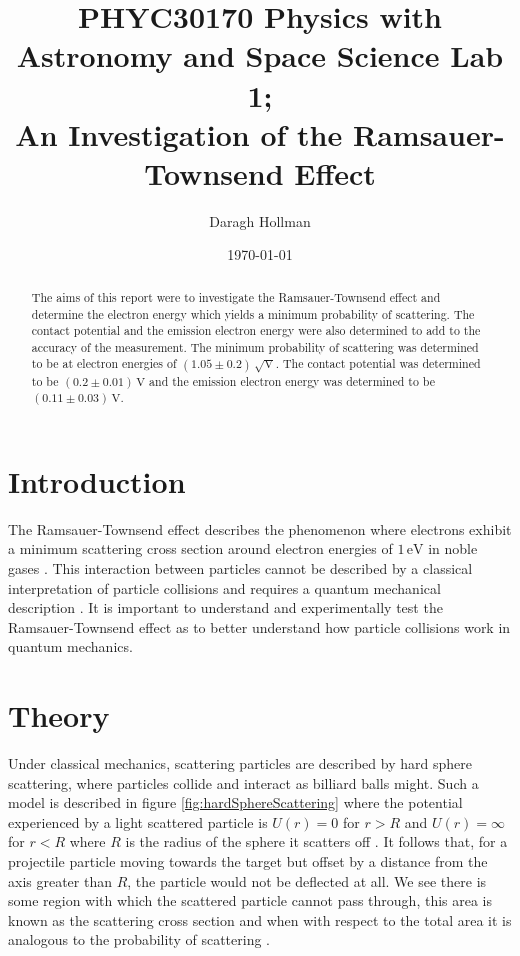 \documentclass[%
reprint,
amsmath,amssymb,
aps,
floatfix
]{revtex4-2}
\begin{document}
	
	
	\title{PHYC30170 Physics with Astronomy and Space Science Lab 1;\\An Investigation of the Ramsauer-Townsend Effect}
	
	\author{Daragh Hollman}
	
	\date{\today}
	
	\begin{abstract}
	The aims of this report were to investigate the Ramsauer-Townsend effect and determine the electron energy which yields a minimum probability of scattering. The contact potential and the emission electron energy were also determined to add to the accuracy of the measurement. The minimum probability of scattering was determined to be at electron energies of $(1.05 \pm 0.2) \,\sqrt{\text{V}}$. The contact potential was determined to be $(0.2 \pm 0.01) \,\text{V}$ and the emission electron energy was determined to be $(0.11 \pm 0.03) \,\text{V}$.
	\end{abstract}		
	
	\maketitle
	
	\section{Introduction}
	The Ramsauer-Townsend effect describes the phenomenon where electrons exhibit a minimum scattering cross section around electron energies of $1\,\text{eV}$ in noble gases \cite{wisconsin}. This interaction between particles cannot be described by a classical interpretation of particle collisions and requires a quantum mechanical description \cite{texas}. It is important to understand and experimentally test the Ramsauer-Townsend effect as to better understand how particle collisions work in quantum mechanics.
	
	\section{Theory}	
	Under classical mechanics, scattering particles are described by hard sphere scattering, where particles collide and interact as billiard balls might. Such a model is described in figure \ref{fig:hardSphereScattering} where the potential experienced by a light scattered particle is $U(r) = 0$ for $r > R$ and $U(r) = \infty$ for $r < R$ where $R$ is the radius of the sphere it scatters off \cite{santaBarbara}. It follows that, for a projectile particle moving towards the target but offset by a distance from the axis greater than $R$, the particle would not be deflected at all. We see there is some region with which the scattered particle cannot pass through, this area is known as the scattering cross section and when with respect to the total area it is analogous to the probability of scattering \cite{santaBarbara}.\\
	
\end{document}
